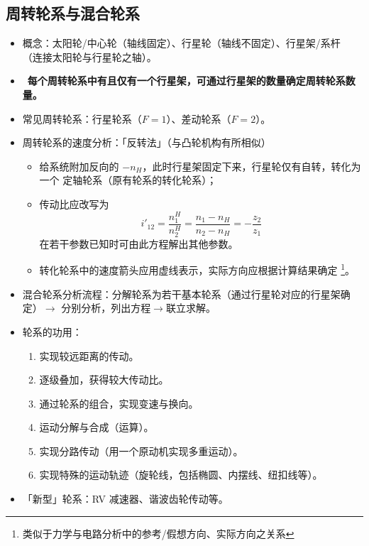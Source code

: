 \documentclass[12pt,a4paper]{article}
\newcommand{\tightlist}{\setlength{\parskip}{0pt}\setlength{\itemsep}{0pt}}
\newcommand{\hint}[1]{\textsf{（#1）}}
\newcommand{\minor}[1]{{\color{gray} #1}}
\newcommand{\then}{$\to$}
\renewcommand{\emph}[1]{\faIcon[regular]{lightbulb}\ \textbf{#1}}
\begin{document}
\subsection{周转轮系与混合轮系}
\begin{itemize}\tightlist
    \item 概念：太阳轮/中心轮\hint{轴线固定}、行星轮\hint{轴线不固定}、行星架/系杆
    \hint{连接太阳轮与行星轮之轴}。
    \item \emph{每个周转轮系中有且仅有一个行星架，可通过行星架的数量确定周转轮系数量。}
    \item 常见周转轮系：行星轮系\hint{$F=1$}、差动轮系\hint{$F=2$}。
    \item 周转轮系的速度分析：「反转法」\hint{与凸轮机构有所相似}
    \begin{itemize}\tightlist
        \item 给系统附加反向的 $-n_H$，此时行星架固定下来，行星轮仅有自转，转化为一个
        定轴轮系\hint{原有轮系的转化轮系}；
        \item 传动比应改写为
        \begin{equation}
        i'_{12}=\frac{n_1^H}{n_2^H}=\frac{n_1-n_H}{n_2-n_H}=-\frac{z_2}{z_1}
        \end{equation}
        在若干参数已知时可由此方程解出其他参数。
        \item 转化轮系中的速度箭头应用虚线表示，实际方向应根据计算结果确定
        \footnote{类似于力学与电路分析中的参考/假想方向、实际方向之关系}。
    \end{itemize}
    \item 混合轮系分析流程：分解轮系为若干基本轮系\hint{通过行星轮对应的行星架确定}\then
    分别分析，列出方程\then 联立求解。
    \item 轮系的功用：
    \begin{enumerate}\tightlist
        \item 实现较远距离的传动。
        \item 逐级叠加，获得较大传动比。
        \item 通过轮系的组合，实现变速与换向。
        \item 运动分解与合成\hint{运算}。
        \item 实现分路传动\hint{用一个原动机实现多重运动}。
        \item 实现特殊的运动轨迹\hint{旋轮线，包括椭圆、内摆线、纽扣线等}。
    \end{enumerate}
    \item \minor{「新型」轮系：RV 减速器、谐波齿轮传动等。}
\end{itemize}
\end{document}
